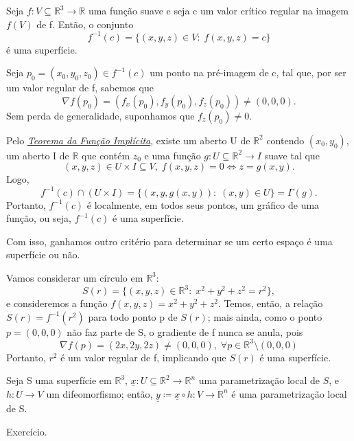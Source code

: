 \documentclass[../differential_geometry.tex]{subfiles}
\begin{document}
\begin{prop*}
	Seja \(f:V\subseteq \mathbb{R}^{3}\rightarrow \mathbb{R}\) uma função suave e seja c um valor crítico regular na imagem \(f(V)\) de f. Então, o conjunto
	\[
		f^{-1}(c) = \{(x, y, z)\in V:\; f(x, y, z) = c\}
	\]
	é uma superfície.
\end{prop*}
\begin{proof*}
	Seja \(p_{0} = (x_{0}, y_{0}, z_{0})\in f^{-1}(c)\) um ponto na pré-imagem de c, tal que, por ser um valor regular de f, sabemos que
	\[
		\nabla f(p_{0}) = (f_{x}(p_{0}), f_{y}(p_{0}), f_{z}(p_{0}))\neq (0, 0, 0).
	\]
	Sem perda de generalidade, suponhamos que \(f_{z}(p_{0}) \neq 0\).

	Pelo \hyperlink{implicit_function}{\textit{Teorema da Função Implícita}}, existe um aberto U de \(\mathbb{R}^{2}\) contendo \((x_{0}, y_{0})\), um aberto I de \(\mathbb{R}\) que contém \(z_{0}\) e uma função \(g:U\subseteq \mathbb{R}^{2}\rightarrow I\) suave tal que
	\[
		(x, y, z)\in U\times I \subseteq V,\; f(x, y, z) = 0 \Longleftrightarrow z = g(x, y).
	\]
	Logo,
	\[
		f^{-1}(c)\cap (U\times I)=\{(x, y, g(x, y)):\; (x, y)\in U\} = \Gamma (g).
	\]
	Portanto, \(f^{-1}(c)\) é localmente, em todos seus pontos, um gráfico de uma função, ou seja, \(f^{-1}(c)\) é uma superfície. \qedsymbol
\end{proof*}
Com isso, ganhamos outro critério para determinar se um certo espaço é uma superfície ou não.
\begin{example}
	Vamos considerar um círculo em \(\mathbb{R}^{3}\):
	\[
		S(r) = \{(x, y, z)\in \mathbb{R}^{3}:\; x^{2}+y^{2}+z^{2}=r^{2}\},
	\]
	e consideremos a função \(f(x, y, z) = x^{2} + y^{2} + z^{2}\). Temos, então, a relação \(S(r) = f^{-1}(r^{2})\) para todo ponto p de \(S(r)\); mais ainda, como o ponto \(p = (0, 0, 0)\) não faz parte de S, o gradiente de f nunca se anula, pois
	\[
		\nabla f(p) = (2x, 2y, 2z) \neq (0, 0, 0),\; \forall p\in \mathbb{R}^{3}\setminus{(0, 0, 0)}
	\]
	Portanto, \(r^{2}\) é um valor regular de f, implicando que \(S(r)\) é uma superfície.
\end{example}

\begin{prop*}
	Seja S uma superfície em \(\mathbb{R}^{3}\), \(\underline{x}:U\subseteq \mathbb{R}^{2}\rightarrow \mathbb{R}^{n}\) uma parametrização local de \(S\), e \(h:U\rightarrow V\) um difeomorfismo; então, \(\underline{y}\coloneqq \underline{x}\circ h :V\rightarrow \mathbb{R}^{n}\) é uma parametrização local de S.
\end{prop*}
\begin{proof*}
	Exercício.
\end{proof*}
\end{document}
